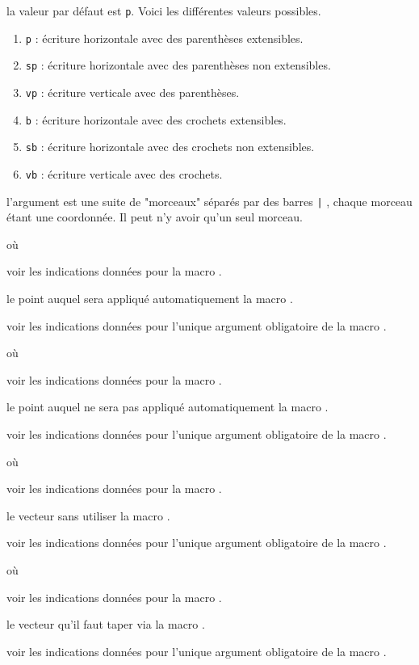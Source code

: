 \documentclass[12pt,a4paper]{article}
\begin{document}
\IDoption{} la valeur par défaut est \verb+p+. Voici les différentes valeurs possibles.
\begin{enumerate}
	\item \verb+p+ : écriture horizontale avec des parenthèses extensibles.

	\item \verb+sp+ : écriture horizontale avec des parenthèses non extensibles.

	\item \verb+vp+ : écriture verticale avec des parenthèses.

	\item \verb+b+ : écriture horizontale avec des crochets extensibles.

	\item \verb+sb+ : écriture horizontale avec des crochets non extensibles.

	\item \verb+vb+ : écriture verticale avec des crochets.
\end{enumerate}


\IDarg{} l'argument est une suite de "morceaux" séparés par des barres \verb+|+ , chaque morceau étant une coordonnée. Il peut n'y avoir qu'un seul morceau.


\separation


 où \quad {}

\IDoption{} voir les indications données pour la macro .

 le point auquel sera appliqué automatiquement la macro .

 voir les indications données pour l'unique argument obligatoire de la macro .


\separation


 où \quad {}

\IDoption{} voir les indications données pour la macro .

 le point auquel ne sera pas appliqué automatiquement la macro .

 voir les indications données pour l'unique argument obligatoire de la macro .


\separation


 où \quad {}

\IDoption{} voir les indications données pour la macro .

 le vecteur sans utiliser la macro .

 voir les indications données pour l'unique argument obligatoire de la macro .


\separation


 où \quad {}

\IDoption{} voir les indications données pour la macro .

 le vecteur qu'il faut taper via la macro .

 voir les indications données pour l'unique argument obligatoire de la macro .
\end{document}
